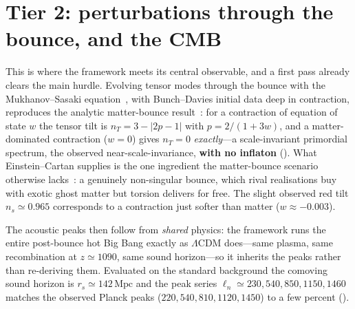 \section{Tier 2: perturbations through the bounce, and the CMB}
\label{sec:tier2}

This is where the framework meets its central observable, and a first pass already
clears the main hurdle. Evolving tensor modes through the bounce with the
Mukhanov--Sasaki equation~\citep{mukhanov1992}, with Bunch--Davies initial data
deep in contraction,
reproduces the analytic matter-bounce result~\citep{wands1999}: for a contraction
of equation of
state $w$ the tensor tilt is $n_T=3-|2p-1|$ with $p=2/(1+3w)$, and a
matter-dominated contraction ($w=0$) gives $n_T=0$ \emph{exactly}---a
scale-invariant primordial spectrum, the observed near-scale-invariance,
\textbf{with no inflaton} (). What Einstein--Cartan supplies
is the one ingredient the matter-bounce scenario otherwise
lacks~\citep{novello2008,brandenberger2017}: a genuinely
non-singular bounce, which rival realisations buy with exotic ghost matter but
torsion delivers for free. The slight observed red tilt $n_s\simeq0.965$
corresponds to a contraction just softer than matter ($w\approx-0.003$).

The acoustic peaks then follow from \emph{shared} physics: the framework runs the
entire post-bounce hot Big Bang exactly as $\Lambda$CDM does---same plasma, same
recombination at $z\simeq1090$, same sound horizon---so it inherits the peaks
rather than re-deriving them. Evaluated on the standard background the comoving
sound horizon is $r_s\simeq142\,\mathrm{Mpc}$ and the peak series
$\ell_n\simeq230,540,850,1150,1460$ matches the observed Planck peaks
($220,540,810,1120,1450$) to a few percent ().

